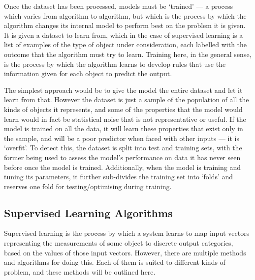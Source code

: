 Once the dataset has been processed, models must be `trained' --- a process which varies from algorithm to algorithm, but which is the process by which the algorithm changes its internal model to perform best on the problem it is given. It is given a dataset to learn from, which in the case of supervised learning is a list of examples of the type of object under consideration, each labelled with the outcome that the algorithm must try to learn. Training here, in the general sense, is the process by which the algorithm learns to develop rules that use the information given for each object to predict the output.

The simplest approach would be to give the model the entire dataset and let it learn from that. However the dataset is just a sample of the population of all the kinds of objects it represents, and some of the properties that the model would learn would in fact be statistical noise that is not representative or useful. If the model is trained on all the data, it will learn these properties that exist only in the sample, and will be a poor predictor when faced with other inputs --- it is `overfit'. To detect this, the dataset is split into test and training sets, with the former being used to assess the model's performance on data it has never seen before once the model is trained. Additionally, when the model is training and tuning its parameters, it further sub-divides the training set into `folds' and reserves one fold for testing/optimising during training.

\subsection{Supervised Learning Algorithms}

Supervised learning is the process by which a system learns to map input vectors representing the measurements of some object to discrete output categories, based on the values of those input vectors. However, there are multiple methods and algorithms for doing this. Each of them is suited to different kinds of problem, and these methods will be outlined here.

